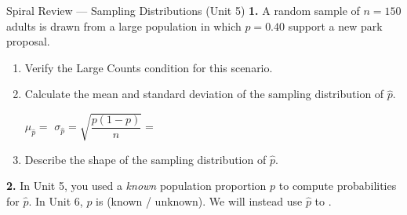 \documentclass[10pt]{article}
\begin{document}
\namedateperiod

\vspace{0.15in}

\begin{notesbox}{Spiral Review --- Sampling Distributions (Unit 5)}
\textbf{1.} A random sample of $n = 150$ adults is drawn from a large population in which
$p = 0.40$ support a new park proposal.

\begin{enumerate}[label=\alph*.]
  \item Verify the Large Counts condition for this scenario. 

  \item Calculate the mean and standard deviation of the sampling distribution of $\hat p$.

        $\mu_{\hat p} = $ \blank{3.5cm} \hfill
        $\sigma_{\hat p} = \sqrt{\dfrac{p(1-p)}{n}} = $ \blank{5cm}

  \item Describe the shape of the sampling distribution of $\hat p$. \writeline
\end{enumerate}

\vspace{0.14in}
\textbf{2.} In Unit 5, you used a \emph{known} population proportion $p$ to compute
probabilities for $\hat p$. In Unit 6, $p$ is \blank{4cm} (known / unknown). We will
instead use $\hat p$ to \blank{9cm}.
\end{notesbox}
\end{document}
